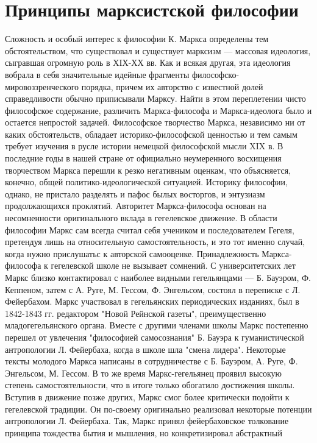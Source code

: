 \documentclass[12pt]{article}
\begin{document}
\section{Принципы марксистской философии}
Сложность и особый интерес к философии К. Маркса определены тем обстоятельством, что существовал и
существует марксизм --- массовая идеология, сыгравшая огромную роль в ХIХ-ХХ вв. Как и всякая другая, эта
идеология вобрала в себя значительные идейные фрагменты философско-мировоззренческого порядка, причем
их авторство с известной долей справедливости обычно приписывали Марксу. Найти в этом переплетении чисто
философское содержание, различить Маркса-философа и Маркса-идеолога было и остается непростой задачей.
Философское  творчество  Маркса,  независимо  ни  от  каких  обстоятельств,  обладает  историко-философской
ценностью и тем самым требует изучения в русле истории немецкой философской мысли XIX в.
В последние годы в нашей стране от официально неумеренного восхищения творчеством Маркса перешли к
резко негативным оценкам, что объясняется, конечно, общей политико-идеологической ситуацией. Историку
философии, однако, не пристало разделять и пафос былых восторгов, и энтузиазм продолжающихся проклятий.
Авторитет  Маркса-философа  основан  на  несомненности  оригинального  вклада  в  гегелевское  движение.  В
области философии Маркс сам всегда считал себя учеником и последователем Гегеля, претендуя лишь на
относительную самостоятельность, и это тот именно случай, когда нужно прислушатьс к авторской самооценке.
Принадлежность Маркса-философа к гегелевской школе не вызывает сомнений. С университетских лет Маркс
близко контактировал с наиболее видными гегельянцами --- Б. Бауэром, Ф. Кеппеном, затем с А. Руге, М. Гессом,
Ф. Энгельсом, состоял в переписке с Л. Фейербахом.
Маркс участвовал в гегельянских периодических изданиях, был в 1842-1843 гг. редактором "Новой Рейнской
газеты", преимущественно младогегельянского органа. Вместе с другими членами школы Маркс постепенно
перешел от увлечения "философией самосознания" Б. Бауэра к гуманистической антропологии Л. Фейербаха,
когда в школе шла "смена лидера".
Некоторые тексты молодого Маркса написаны в сотрудничестве с Б. Бауэром, А. Руге, Ф. Энгельсом, М. Гессом.
В то же время Маркс-гегельянец проявил высокую степень самостоятельности, что в итоге только обогатило
достижения школы. Вступив в движение позже других, Маркс смог более критически подойти к гегелевской
традиции.
Он по-своему оригинально реализовал некоторые потенции антропологии Л. Фейербаха. Так, Маркс принял
фейербаховское  толкование  принципа  тождества  бытия  и  мышления,  но  конкретизировал  абстрактный
\end{document}
